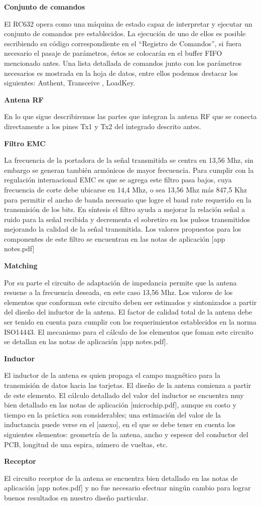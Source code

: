\bigskip
{\bf{Conjunto de comandos}}

El RC632 opera como una máquina de estado capaz de interpretar y ejecutar un conjunto de comandos pre establecidos. La ejecución de uno de ellos es posible escribiendo su código correspondiente en el “Registro de Comandos”, si fuera necesario el pasaje de parámetros, éstos se colocarán en el buffer FIFO mencionado antes. 
Una lista detallada de comandos junto con los parámetros necesarios es mostrada en la hoja de datos, entre ellos podemos destacar los siguientes: Authent, Transceive , LoadKey.

\bigskip
{\bf{Antena RF}}

En lo que sigue describiremos las partes que integran la antena RF que se conecta directamente a los pines Tx1 y Tx2 del integrado descrito antes.

\bigskip
{\bf{Filtro EMC}}

La frecuencia de la portadora de la señal transmitida se centra en 13,56 Mhz, sin embargo se generan también armónicos de mayor frecuencia. Para cumplir con la regulación internacional EMC es que se agrega este filtro pasa bajos, cuya frecuencia de corte debe ubicarse en 14,4 Mhz, o sea 13,56 Mhz más 847,5 Khz para permitir el ancho de banda necesario que logre el baud rate requerido en la transmisión de los bits. 
En síntesis el filtro ayuda a mejorar la relación señal a ruido para la señal recibida y decrementa el sobretiro en los pulsos transmitidos mejorando la calidad de la señal transmitida.
Los valores propuestos para los componentes de este filtro se encuentran en las notas de aplicación [app notes.pdf]

\bigskip
{\bf{Matching}}

Por su parte el circuito de adaptación de impedancia permite que la antena resuene a la frecuencia deseada, en este caso 13,56 Mhz. Los valores de los elementos que conforman este circuito deben ser estimados y sintonizados a partir del diseño del inductor de la antena.
El factor de calidad total de la antena debe ser tenido en cuenta para cumplir con los requerimientos establecidos en la norma ISO14443. 
El mecanismo para el cálculo de los elementos que foman este circuito se detallan en las notas de aplicación [app notes.pdf].

\bigskip
{\bf{Inductor}}

El inductor de la antena es quien propaga el campo magnético para la transmisión de datos hacia las tarjetas. El diseño de la antena comienza a partir de este elemento.
El cálculo detallado del valor del inductor se encuentra muy bien detallado en las notas de aplicación [microchip.pdf], aunque su costo y tiempo en la práctica son considerables; una estimación del valor de la inductancia puede verse en el [anexo], en el que se debe tener en cuenta los siguientes elementos: geometría de la antena, ancho y espesor del conductor del PCB, longitud de una espira, número de vueltas, etc.

\bigskip
{\bf{Receptor}} 

El circuito receptor de la antena se encuentra bien detallado en las notas de aplicación [app notes.pdf] y no fue necesario efectuar ningún cambio para lograr buenos resultados en nuestro diseño particular. 